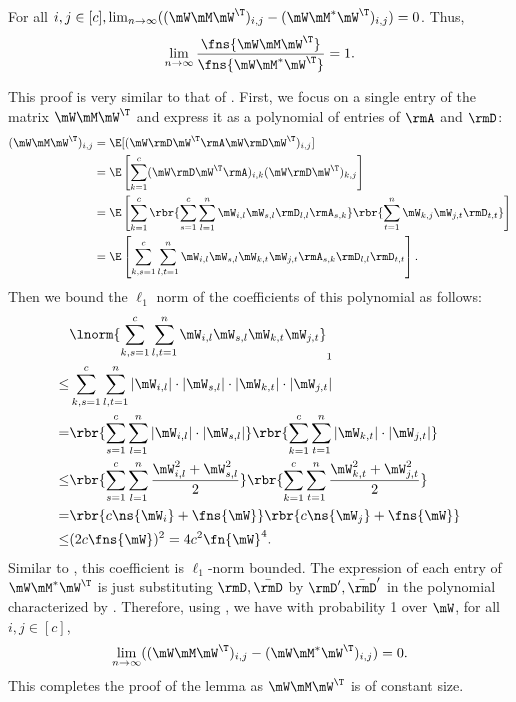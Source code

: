 \begin{proofof}{}
\begin{lemma}
\label{lemma:WMW-equivalence}
For all $i,j\in[c], \lim_{n\to\infty}((\mW\mM\mW^\T)_{i,j}-(\mW\mM^*\mW^\T)_{i,j})=0$. Thus, \[\lim_{n\to\infty}\frac{\fns{\mW\mM\mW^\T}}{\fns{\mW\mM^*\mW^\T}}=1.\]
\end{lemma}
\begin{proofof}{}
This proof is very similar to that of . First, we focus on a single entry of the matrix $\mW\mM\mW^\T$ and express it as a polynomial of entries of $\rmA$ and $\rmD$:
\begin{equation}
\label{eqn:proof-WMW-equiv-poly}
\begin{split}
(\mW\mM\mW^\T)_{i,j} &= \E[(\mW\rmD\mW^\T\rmA\mW\rmD\mW^\T)_{i,j}]\\
              &= \E\left[\sum_{k=1}^c(\mW\rmD\mW^\T\rmA)_{i,k}(\mW\rmD\mW^\T)_{k,j}\right]\\
              &= \E\left[\sum_{k=1}^c\rbr{\sum_{s=1}^c\sum_{l=1}^n\mW_{i,l}\mW_{s,l}\rmD_{l,l}\rmA_{s,k}}\rbr{\sum_{t=1}^n\mW_{k,j}\mW_{j,t}\rmD_{t,t}}\right]\\
              &= \E\left[\sum_{k,s=1}^c\sum_{l,t=1}^n\mW_{i,l}\mW_{s,l}\mW_{k,t}\mW_{j,t}\rmA_{s,k}\rmD_{l,l}\rmD_{t,t}\right].
\end{split}
\end{equation}
Then we bound the $\ell_1$ norm of the coefficients of this polynomial as follows:
\begin{equation}
\label{eqn:proof-WMW-equiv-l1bound}
\begin{split}
    &\lnorm{\sum_{k,s=1}^c\sum_{l,t=1}^n\mW_{i,l}\mW_{s,l}\mW_{k,t}\mW_{j,t}}_1\\
    \leq &\sum_{k,s=1}^c\sum_{l,t=1}^n|\mW_{i,l}|\cdot|\mW_{s,l}|\cdot|\mW_{k,t}|\cdot|\mW_{j,t}|\\
    =    &\rbr{\sum_{s=1}^c\sum_{l=1}^n|\mW_{i,l}|\cdot|\mW_{s,l}|}\rbr{\sum_{k=1}^c\sum_{t=1}^n|\mW_{k,t}|\cdot|\mW_{j,t}|}\\
    \leq &\rbr{\sum_{s=1}^c\sum_{l=1}^n\frac{\mW_{i,l}^2+\mW_{s,l}^2}{2}}\rbr{\sum_{k=1}^c\sum_{t=1}^n\frac{\mW_{k,t}^2+\mW_{j,t}^2}{2}}\\
    =    &\rbr{c\ns{\mW_i}+\fns{\mW}}\rbr{c\ns{\mW_j}+\fns{\mW}}\\
    \leq &(2c\fns{\mW})^2=4c^2\fn{\mW}^4.
\end{split}
\end{equation}
Similar to , this coefficient is $\ell_1$-norm bounded. 
The expression of each entry of $\mW\mM^*\mW^\T$ is just substituting $\rmD,\bar\rmD$ by $\rmD',\bar\rmD'$ in the polynomial characterized by .
Therefore, using , we have with probability 1 over $\mW$, for all $i,j\in[c]$, 
\begin{equation}
    \lim_{n\to\infty}((\mW\mM\mW^\T)_{i,j}-(\mW\mM^*\mW^\T)_{i,j})=0.
\end{equation}
This completes the proof of the lemma as $\mW\mM\mW^\T$ is of constant size.
\end{proofof}



\end{proofof}
